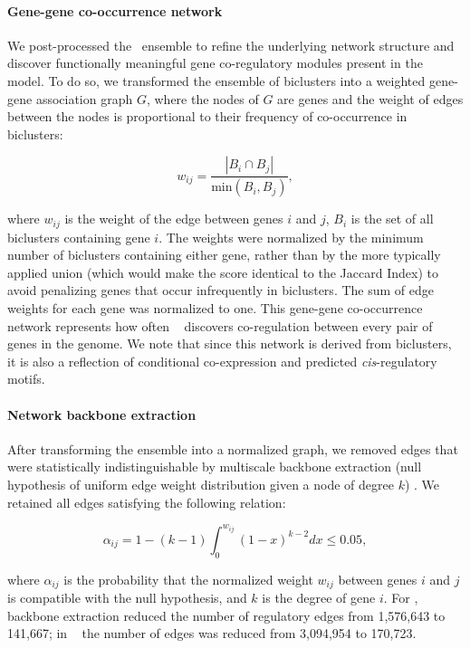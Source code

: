 \paragraph{Gene-gene co-occurrence network}
\label{section:gBg}

We post-processed the \egrine~ensemble to refine the underlying
network structure and discover functionally meaningful gene
co-regulatory modules present in the model. To do so, we transformed
the ensemble of biclusters into a weighted gene-gene association graph
$G$, where the nodes of $G$ are genes and the weight of edges between the
nodes is proportional to their frequency of co-occurrence in
biclusters:

\begin{equation}
w_{ij} = \frac{\left|B_i\cap B_j\right|}{\mathrm{min}(B_i,B_j)},
\end{equation}

\noindent where $w_{ij}$ is the weight of the edge between genes $i$ and $j$,
$B_i$ is the set of all biclusters containing gene $i$. The weights
were normalized by the minimum number of biclusters containing either
gene, rather than by the more typically applied union (which would
make the score identical to the Jaccard Index) to avoid penalizing
genes that occur infrequently in biclusters. The sum of edge weights
for each gene was normalized to one. This gene-gene co-occurrence
network represents how often \cm~ discovers co-regulation between
every pair of genes in the genome. We note that since this network is
derived from biclusters, it is also a reflection of conditional
co-expression and predicted \textit{cis}-­regulatory motifs.

\paragraph{Network backbone extraction}

After transforming the ensemble into a normalized graph, we removed
edges that were statistically indistinguishable by multiscale backbone
extraction (null hypothesis of uniform edge weight distribution given
a node of degree $k$) \cite{Serrano2009}. We retained all edges
satisfying the following relation:

\begin{equation}
\alpha_{ij}=1-(k-1)\int_0^{w_{ij}}(1-x)^{k-2}dx\leq 0.05,
\end{equation}

\noindent where $\alpha_{ij}$ is the probability that the normalized weight $w_{ij}$ between
genes $i$ and $j$ is compatible with the null hypothesis, and $k$ is
the degree of gene $i$. For \halo, backbone extraction reduced the
number of regulatory edges from 1,576,643 to 141,667; in \eco~ the
number of edges was reduced from 3,094,954 to 170,723.

